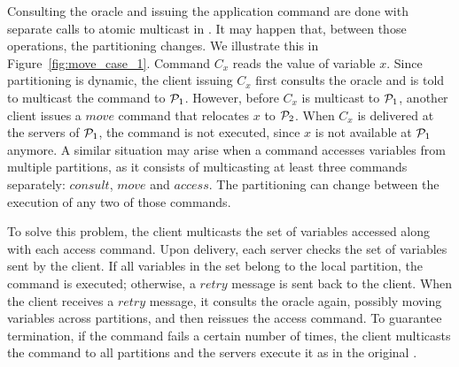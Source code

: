 Consulting the oracle and issuing the application command are done with separate calls to atomic multicast in \dssmr{}.
It may happen that, between those operations, the partitioning changes.
We illustrate this in Figure~\ref{fig:move_case_1}.
Command $C_x$ reads the value of variable $x$.
Since partitioning is dynamic, the client issuing $C_x$ first consults the oracle and is told to multicast the command to $\mathcal{P}_1$.
However, before $C_x$ is multicast to $\mathcal{P}_1$, another client issues a $move$ command that relocates $x$ to $\mathcal{P}_2$.
When $C_x$ is delivered at the servers of $\mathcal{P}_1$, the command is not executed, since $x$ is not available at $\mathcal{P}_1$ anymore.
A similar situation may arise when a command accesses variables from multiple partitions, as it consists of multicasting at least three commands separately: $consult$, $move$ and $access$.
The partitioning can change between the execution of any two of those commands.




To solve this problem, the client multicasts the set of variables accessed along with each access command.
Upon delivery, each server checks the set of variables sent by the client.
If all variables in the set belong to the local partition, the command is executed; otherwise, a $retry$ message is sent back to the client.
When the client receives a $retry$ message, it consults the oracle again, possibly moving variables across partitions, and then reissues the access command.
To guarantee termination, if the command fails a certain number of times, the client multicasts the command to all partitions and the servers execute it as in the original \ssmr{}.



